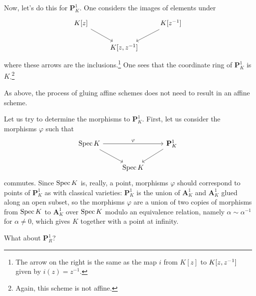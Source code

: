 \documentclass [11 pt, oneside] {article}
\begin{document}
\begin{example}[ ]\label{}\text{}
Now, let's do this for $\mathbf{P}^1_K$. One considers the images of elements under
\[
\begin{tikzcd}
        K[z]\ar[dr] && K[z^{-1}] \ar[dl]\\
        &K[z,z^{-1}]
\end{tikzcd}
\]
where these arrows are the inclusions.\footnote{The arrow on the right is the same as the map $i$ from $K[z]$ to $K[z,z^{-1}]$ given by $i(z)= z^{-1}$.} 
One sees that the coordinate ring of $\mathbf{P}^1_K$ is $K$.\footnote{Again, this scheme is not affine.}
\end{example}

\begin{remark}
	As above, the process of gluing affine schemes does not need to result in an affine scheme.
\end{remark}

Let us try to determine the morphisms to $\mathbf{P}^1_K$. First, let us consider the morphisms $\varphi$ such that 
\[
\begin{tikzcd}
	\Spec K \ar[dr]\ar[rr,"\varphi"] && \mathbf{P}^1_K\ar[dl]\\
					 &\Spec K
\end{tikzcd}
\]
commutes. Since $\operatorname{Spec} K$ is, really, a point, morphisms $\varphi$ should correspond to points of $\mathbf{P}^1_K$ as with classical varieties: $\mathbf{P}^1_K$ is the union of $\mathbf{A}^1_K$ and $\mathbf{A}^1_K$ glued along an open subset, so the morphisms $\varphi$ are a union of two copies of morphisms from $\operatorname{Spec} K$ to $\mathbf{A}^1_K$ over $\operatorname{Spec} K$ modulo an equivalence relation, namely $\alpha\sim \alpha ^{-1}$ for $\alpha\ne 0$, which gives $K$ together with a point at infinity.

\begin{problem}
	What about $\mathbf{P}^1_{R}$?
\end{problem}
\end{document}
